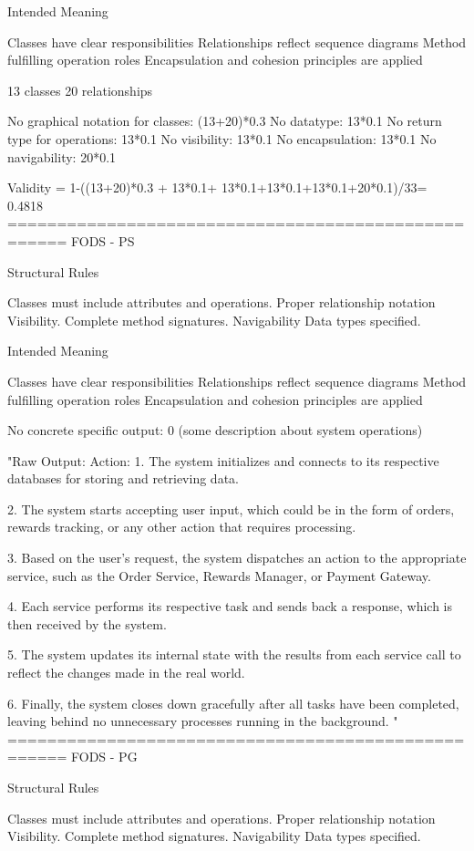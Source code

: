 Intended Meaning

Classes have clear responsibilities
Relationships reflect sequence diagrams
Method fulfilling operation roles
Encapsulation and cohesion principles are applied

13 classes
20 relationships

No graphical notation for classes: (13+20)*0.3
No datatype: 13*0.1
No return type for operations: 13*0.1
No visibility: 13*0.1
No encapsulation: 13*0.1
No navigability: 20*0.1

Validity = 1-((13+20)*0.3 + 13*0.1+ 13*0.1+13*0.1+13*0.1+20*0.1)/33=  0.4818
====================================================
FODS - PS

Structural Rules

Classes must include attributes and operations.
Proper relationship notation 
Visibility.
Complete method signatures.
Navigability
Data types specified.

Intended Meaning

Classes have clear responsibilities
Relationships reflect sequence diagrams
Method fulfilling operation roles
Encapsulation and cohesion principles are applied

No concrete specific output: 0 (some description about system operations)

"Raw Output: Action: 1. The system initializes and connects to its respective databases for storing and retrieving data.

2. The system starts accepting user input, which could be in the form of orders, rewards tracking, or any other action that requires processing.

3. Based on the user's request, the system dispatches an action to the appropriate service, such as the Order Service, Rewards Manager, or Payment Gateway.

4. Each service performs its respective task and sends back a response, which is then received by the system.

5. The system updates its internal state with the results from each service call to reflect the changes made in the real world.

6. Finally, the system closes down gracefully after all tasks have been completed, leaving behind no unnecessary processes running in the background.
"
====================================================
FODS - PG

Structural Rules

Classes must include attributes and operations.
Proper relationship notation 
Visibility.
Complete method signatures.
Navigability
Data types specified.

